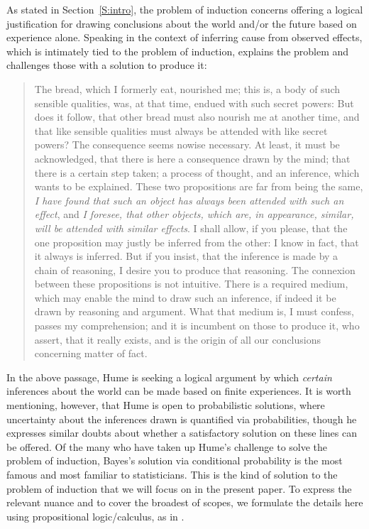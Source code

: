 \documentclass[a4paper, 12pt]{article}
\theoremstyle{plain}
\theoremstyle{definition}
\theoremstyle{remark}
\begin{document}
As stated in Section~\ref{S:intro}, the problem of induction concerns offering a logical justification for drawing conclusions about the world and/or the future based on experience alone.  Speaking in the context of inferring cause from observed effects, which is intimately tied to the problem of induction, \citet[][Sec.~IV, Part~II]{hume.enquiry} explains the problem and challenges those with a solution to produce it: 
\begin{quote}
The bread, which I formerly eat, nourished me; this is, a body of such sensible qualities, was, at that time, endued with such secret powers: But does it follow, that other bread must also nourish me at another time, and that like sensible qualities must always be attended with like secret powers? The consequence seems nowise necessary.  At least, it must be acknowledged, that there is here a consequence drawn by the mind; that there is a certain step taken; a process of thought, and an inference, which wants to be explained.  These two propositions are far from being the same, {\em I have found that such an object has always been attended with such an effect}, and {\em I foresee, that other objects, which are, in appearance, similar, will be attended with similar effects}. I shall allow, if you please, that the one proposition may justly be inferred from the other: I know in fact, that it always is inferred.  But if you insist, that the inference is made by a chain of reasoning, I desire you to produce that reasoning.  The connexion between these propositions is not intuitive.  There is a required medium, which may enable the mind to draw such an inference, if indeed it be drawn by reasoning and argument.  What that medium is, I must confess, passes my comprehension; and it is incumbent on those to produce it, who assert, that it really exists, and is the origin of all our conclusions concerning matter of fact.
\end{quote}
In the above passage, Hume is seeking a logical argument by which {\em certain} inferences about the world can be made based on finite experiences.  It is worth mentioning, however, that Hume is open to probabilistic solutions, where uncertainty about the inferences drawn is quantified via probabilities, though he expresses similar doubts about whether a satisfactory solution on these lines can be offered.  Of the many who have taken up Hume's challenge to solve the problem of induction, Bayes's solution via conditional probability is the most famous and most familiar to statisticians.  This is the kind of solution to the problem of induction that we will focus on in the present paper.  To express the relevant nuance and to cover the broadest of scopes, we formulate the details here using propositional logic/calculus, as in \citet[][Sec.~1.2]{jeffreys1961}.
\end{document}
